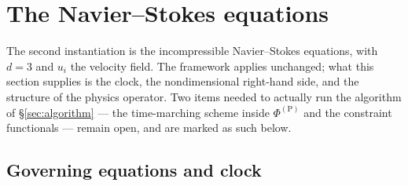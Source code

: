\section{The Navier--Stokes equations}\label{sec:ns}

The second instantiation is the incompressible Navier--Stokes equations, with
$d = 3$ and $u_i$ the velocity field. The framework applies unchanged; what
this section supplies is the clock, the nondimensional right-hand side, and
the structure of the physics operator. Two items needed to actually run the
algorithm of \S\ref{sec:algorithm} --- the time-marching scheme inside
$\Phi^{(\mathrm{P})}$ and the constraint functionals --- remain open, and are
marked as such below.

\subsection{Governing equations and clock}\label{ssec:ns-clock}


